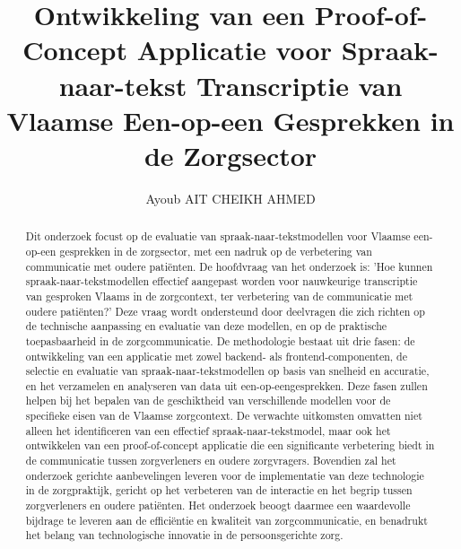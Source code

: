 \documentclass{hogent-article}
\title{Ontwikkeling van een Proof-of-Concept Applicatie voor Spraak-naar-tekst Transcriptie van Vlaamse Een-op-een Gesprekken in de Zorgsector}
\author{Ayoub AIT CHEIKH AHMED}
\begin{document}
\begin{abstract}
Dit onderzoek focust op de evaluatie van spraak-naar-tekstmodellen voor Vlaamse een-op-een gesprekken in de zorgsector, met een nadruk op de verbetering van communicatie met oudere patiënten. De hoofdvraag van het onderzoek is: 'Hoe kunnen spraak-naar-tekstmodellen effectief aangepast worden voor nauwkeurige transcriptie van gesproken Vlaams in de zorgcontext, ter verbetering van de communicatie met oudere patiënten?' Deze vraag wordt ondersteund door deelvragen die zich richten op de technische aanpassing en evaluatie van deze modellen, en op de praktische toepasbaarheid in de zorgcommunicatie.
De methodologie bestaat uit drie fasen: de ontwikkeling van een applicatie met zowel backend- als frontend-componenten, de selectie en evaluatie van spraak-naar-tekstmodellen op basis van snelheid en accuratie, en het verzamelen en analyseren van data uit een-op-eengesprekken. Deze fasen zullen helpen bij het bepalen van de geschiktheid van verschillende modellen voor de specifieke eisen van de Vlaamse zorgcontext.
De verwachte uitkomsten omvatten niet alleen het identificeren van een effectief spraak-naar-tekstmodel, maar ook het ontwikkelen van een proof-of-concept applicatie die een significante verbetering biedt in de communicatie tussen zorgverleners en oudere zorgvragers. Bovendien zal het onderzoek gerichte aanbevelingen leveren voor de implementatie van deze technologie in de zorgpraktijk, gericht op het verbeteren van de interactie en het begrip tussen zorgverleners en oudere patiënten. Het onderzoek beoogt daarmee een waardevolle bijdrage te leveren aan de efficiëntie en kwaliteit van zorgcommunicatie, en benadrukt het belang van technologische innovatie in de persoonsgerichte zorg.
\end{abstract}

\tableofcontents



\printbibliography[heading=bibintoc]
\end{document}
